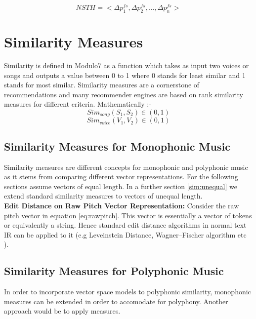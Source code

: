 \begin{equation}
NSTH = <\Delta p^{fs}_1, \Delta p^{fs}_2, ... , \Delta p^{fs}_n>
\end{equation}

\section{Similarity Measures}

\noindent Similarity is defined in Modulo7 as a function which takes as input two voices or songs and outputs a value between 0 to 1 where 0 stands for least similar and 1 stands for most similar. Similarity measures are a cornerstone of recommendations and many recommender engines are based on rank similarity measures for different criteria. Mathematically :-
\begin{equation}
Sim_{song}(S_1, S_2) \in (0, 1)
\end{equation}
\begin{equation}
Sim_{voice}(V_1, V_2) \in (0, 1)
\end{equation}

\subsection{Similarity Measures for Monophonic Music}

\noindent Similarity measures are different concepts for monophonic and polyphonic music as it stems from comparing different vector representations. For the following sections assume vectors of equal length. In a further section \ref{sim:unequal} we extend standard similarity measures to vectors of unequal length. \\

\noindent \textbf{Edit Distance on Raw Pitch Vector Representation:} Consider the raw pitch vector in equation \ref{eq:rawpitch}. This vector is essentially a vector of tokens or equivalently a string. Hence standard edit distance algorithms in normal text IR can be applied to it (e.g Leveinstein Distance, Wagner–Fischer algorithm etc \cite{simtour}).

\subsection{Similarity Measures for Polyphonic Music}

\noindent In order to incorporate vector space models to polyphonic similarity, monophonic measures can be extended in order to accomodate for polyphony. Another approach would be to apply measures.

